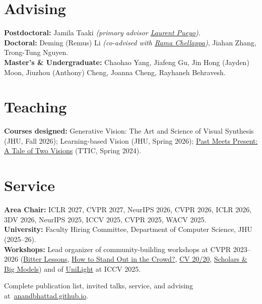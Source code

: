 \else
\section{Advising}
\textbf{Postdoctoral:} Jamila Taaki \textit{(primary advisor \href{https://www.stsci.edu/~pueyo/}{Laurent Pueyo})}.\\[2pt]
\textbf{Doctoral:} Deming (Remus) Li \textit{(co-advised with \href{https://engineering.jhu.edu/faculty/rama-chellappa/}{Rama Chellappa})}, Jiahan Zhang, Trong-Tung Nguyen.\\[2pt]
\textbf{Master's \& Undergraduate:} Chaohao Yang, Jiafeng Gu, Jin Hong (Jayden) Moon, Jiuzhou (Anthony) Cheng, Joanna Cheng, Rayhaneh Behravesh.\par\medskip
\section{Teaching}
\textbf{Courses designed:} Generative Vision: The Art and Science of Visual Synthesis (JHU, Fall 2026); Learning-based Vision (JHU, Spring 2026); \href{https://anandbhattad.github.io/teaching/past_meets_present/}{Past Meets Present: A Tale of Two Visions} (TTIC, Spring 2024).
\section{Service}
\textbf{Area Chair:} ICLR 2027, CVPR 2027, NeurIPS 2026, CVPR 2026, ICLR 2026, 3DV 2026, NeurIPS 2025, ICCV 2025, CVPR 2025, WACV 2025.\\[2pt]
\textbf{University:} Faculty Hiring Committee, Department of Computer Science, JHU (2025--26).\\[2pt]
\textbf{Workshops:} Lead organizer of community-building workshops at CVPR 2023--2026 (\href{https://sites.google.com/view/bitterlessonscv/}{Bitter Lessons}, \href{https://sites.google.com/view/standoutcv}{How to Stand Out in the Crowd?}, \href{https://sites.google.com/view/retrocv/}{CV 20/20}, \href{https://sites.google.com/view/academic-cv/}{Scholars \& Big Models}) and of \href{https://unilight-workshop.github.io/unilight2025/}{UniLight} at ICCV 2025.\par\smallskip
{\color{muted}Complete publication list, invited talks, service, and advising at}~\href{https://anandbhattad.github.io/}{anandbhattad.github.io}.
\fi
